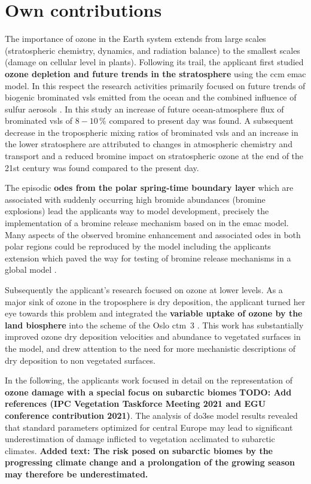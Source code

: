 \section{Own contributions}
\label{sec:contrib}
The importance of ozone in the Earth system extends from large scales (stratospheric chemistry, dynamics, and radiation balance) to the smallest scales (damage on cellular level in plants). Following its trail, the applicant first studied \textbf{ozone depletion and future trends in the stratosphere} using the \gls{ccm} \gls{emac} model. In this respect the research activities primarily focused on future trends of biogenic brominated \gls{vsls} emitted from the ocean and the combined influence of sulfur aerosols \parencite{ACP:Falk2017}. In this study an increase of future ocean-atmosphere flux of brominated \gls{vsls} of $8-10\,\%$ compared to present day was found. A subsequent decrease in the tropospheric mixing ratios of brominated \gls{vsls} and an increase in the lower stratosphere are attributed to changes in atmospheric chemistry and transport and a reduced bromine impact on stratospheric ozone at the end of the 21st century was found  compared to the present day.

The episodic \textbf{\glspl{ode} from the polar spring-time boundary layer} which are associated with suddenly occurring high bromide abundances (bromine explosions) lead the applicants way to model development, precisely the implementation of a bromine release mechanism based on \textcite{ACP:Toyota2011} in the \gls{emac} model. Many aspects of the observed bromine enhancement and associated \glspl{ode} in both polar regions could be reproduced by the model including the applicants extension which paved the way for testing of bromine release mechanisms in a global model \parencite{GMD:Falk2018}.

Subsequently the applicant’s research focused on ozone at lower levels. As a major sink of ozone in the troposphere is dry deposition, the applicant turned her eye towards this problem and integrated the \textbf{variable uptake of ozone by the land biosphere} into the scheme of the Oslo \gls{ctm}~3 \parencite{GMD:Falk2019}. This work has substantially improved ozone dry deposition velocities and abundance to vegetated surfaces in the model, and drew attention to the need for more mechanistic descriptions of dry deposition to non vegetated surfaces.

In the following, the applicants work focused in detail on the representation of \textbf{ozone damage with a special focus on subarctic biomes} \textbf{\color{red}TODO: Add references (IPC Vegetation Taskforce Meeting 2021 and EGU conference contribution 2021)}. The analysis of \gls{do3se} model results revealed that standard parameters optimized for central Europe may lead to significant underestimation of damage inflicted to vegetation acclimated to subarctic climates. \textbf{\color{blue}Added text: The risk posed on subarctic biomes by the progressing climate change and a prolongation of the growing season may therefore be underestimated.}

